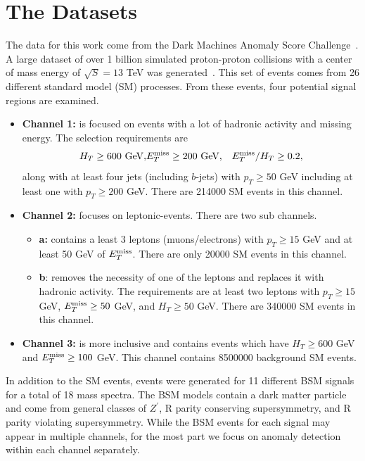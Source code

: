 \documentclass[submission, Phys]{SciPost}
\begin{document}
\section{The Datasets}
\label{sec:Data}
The data for this work come from the Dark Machines Anomaly Score Challenge~\cite{Aarrestad:2021oeb}.
A large dataset of over 1 billion simulated proton-proton collisions with a center of mass energy of $\sqrt{S}=13$ TeV was generated~\cite{darkmachines_community_2020_3685861}.
This set of events comes from 26 different standard model (SM) processes.
From these events, four potential signal regions are examined.
\begin{itemize}
	\item \textbf{Channel 1:} is focused on events with a lot of hadronic activity and missing energy. The selection requirements are
	\begin{eqnarray*}
	H_T \geq 600 \text{ GeV}, & E_{T}^{\rm{miss}} \geq 200 \text{ GeV,}& E_T^{\rm{miss}} / H_T \geq 0.2,
	\end{eqnarray*}
	along with at least four jets (including $b$-jets) with $p_T \geq 50$ GeV including at least one with $p_T \geq 200$ GeV. There are \num{214000} SM events in this channel.

	\item \textbf{Channel 2:} focuses on leptonic-events. There are two sub channels.
	\begin{itemize}
		\item \textbf{a:} contains a least 3 leptons (muons/electrons) with $p_T \geq 15$ GeV and at least 50 GeV of $E_T^{\rm{miss}}$. There are only \num{20000} SM events in this channel.
		\item \textbf{b}: removes the necessity of one of the leptons and replaces it with hadronic activity. The requirements are at least two leptons with $p_T \geq 15$ GeV, $E_T^{\rm{miss}} \geq 50$ GeV, and $H_T \geq 50$ GeV. There are \num{340000} SM events in this channel.
	\end{itemize}

	\item \textbf{Channel 3:} is more inclusive and contains events which have $H_T \geq 600$ GeV and $E_T^{\rm{miss}} \geq 100$ GeV. This channel contains \num{8500000} background SM events.
\end{itemize}

In addition to the SM events, events were generated for 11 different BSM signals for a total of 18 mass spectra.
The BSM models contain a dark matter particle and come from general classes of $Z^{\prime}$, R parity conserving supersymmetry, and R parity violating supersymmetry.
While the BSM events for each signal may appear in multiple channels, for the most part we focus on anomaly detection within each channel separately.
\end{document}
